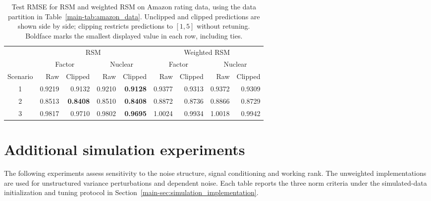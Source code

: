 \documentclass[numsec,webpdf,modern,large,namedate]{oup-authoring-template}
\theoremstyle{plain}
\theoremstyle{remark}
\begin{document}
\begin{table}[!htbp]
\centering
\caption{Test RMSE for RSM and weighted RSM on Amazon rating data, using the data partition in Table~\ref{main-tab:amazon_data}. Unclipped and clipped predictions are shown side by side; clipping restricts predictions to $[1,5]$ without retuning. Boldface marks the smallest displayed value in each row, including ties.}
\label{tab:amazon_absolute}
\begingroup
\small
{}
\setlength{\tabcolsep}{4pt}
\begin{tabular}{@{}crrrrrrrr@{}}
\toprule
 & \multicolumn{4}{c}{RSM} & \multicolumn{4}{c}{Weighted RSM} \\
\cmidrule(lr){2-5}\cmidrule(lr){6-9}
 & \multicolumn{2}{c}{Factor} & \multicolumn{2}{c}{Nuclear} & \multicolumn{2}{c}{Factor} & \multicolumn{2}{c}{Nuclear} \\
\cmidrule(lr){2-3}\cmidrule(lr){4-5}\cmidrule(lr){6-7}\cmidrule(lr){8-9}
Scenario & Raw & Clipped & Raw & Clipped & Raw & Clipped & Raw & Clipped \\
\midrule
1 & 0.9219 & 0.9132 & 0.9210 & \textbf{0.9128} & 0.9377 & 0.9313 & 0.9372 & 0.9309 \\
2 & 0.8513 & \textbf{0.8408} & 0.8510 & \textbf{0.8408} & 0.8872 & 0.8736 & 0.8866 & 0.8729 \\
3 & 0.9817 & 0.9710 & 0.9802 & \textbf{0.9695} & 1.0024 & 0.9934 & 1.0018 & 0.9942 \\
\bottomrule
\end{tabular}
\endgroup
\end{table}

\section{Additional simulation experiments}
The following experiments assess sensitivity to the noise structure, signal conditioning and working rank. The unweighted implementations are used for unstructured variance perturbations and dependent noise. Each table reports the three norm criteria under the simulated-data initialization and tuning protocol in Section~\ref{main-sec:simulation_implementation}.
\end{document}
